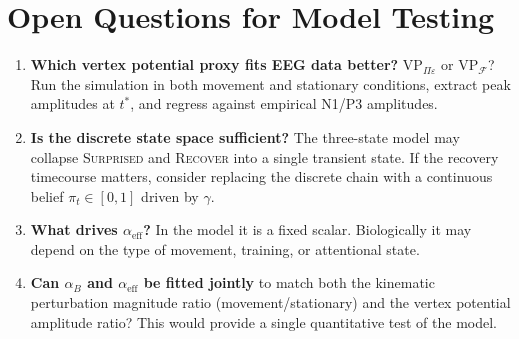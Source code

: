 \documentclass[11pt, a4paper]{article}
\newcommand{\FE}{\mathcal{F}}
\begin{document}
\section{Open Questions for Model Testing}

\begin{enumerate}[leftmargin=*, label=\textbf{Q\arabic*.}]

  \item \textbf{Which vertex potential proxy fits EEG data better?}
    $\text{VP}_{\Pi\varepsilon}$ or $\text{VP}_\FE$?
    Run the simulation in both movement and stationary conditions,
    extract peak amplitudes at $t^*$, and regress against empirical
    N1/P3 amplitudes.

  \item \textbf{Is the discrete state space sufficient?}
    The three-state model may collapse \textsc{Surprised} and
    \textsc{Recover} into a single transient state.
    If the recovery timecourse matters, consider replacing the discrete
    chain with a continuous belief $\pi_t \in [0,1]$ driven by $\gamma$.

  \item \textbf{What drives $\alpha_{\text{eff}}$?}
    In the model it is a fixed scalar. Biologically it may depend on
    the type of movement, training, or attentional state.

  \item \textbf{Can $\alpha_B$ and $\alpha_{\text{eff}}$ be fitted jointly}
    to match both the kinematic perturbation magnitude ratio
    (movement/stationary) and the vertex potential amplitude ratio?
    This would provide a single quantitative test of the model.

\end{enumerate}
\end{document}
